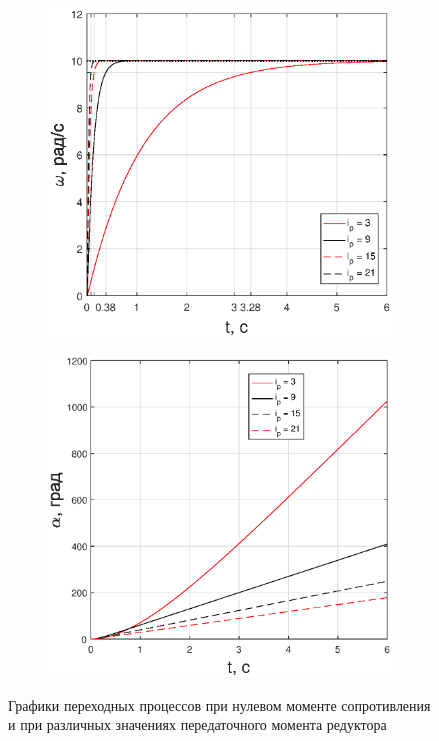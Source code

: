 \documentclass[fleqn, a4paper, 11pt, russian]{article}
\begin{document}
	\begin{figure}[ht!]\ContinuedFloat
		\centering
		\begin{subfigure}[b]{0.48\textwidth}
			\includegraphics[width = \textwidth]{ivar/eps/ivarOmega}
		\end{subfigure}
		\hfill
		\begin{subfigure}[b]{0.48\textwidth}
			\includegraphics[width = \textwidth]{ivar/eps/ivarAlpha}
		\end{subfigure}
		\caption{Графики переходных процессов при нулевом моменте сопротивления и при различных значениях передаточного момента редуктора}
		\label{M0ivar}
	\end{figure}
	
\end{document}
